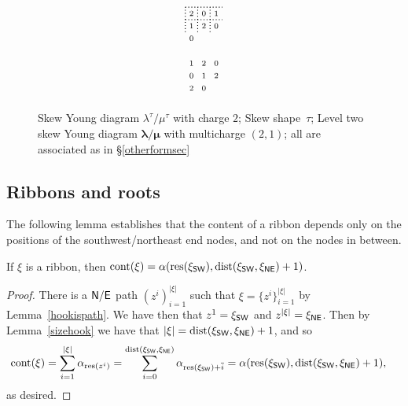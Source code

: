 \documentclass[Unicode,ALCO]{cedram}
\newcommand{\res}{\operatorname{res}}
\newcommand{\0}{{\bar 0}}
\newcommand{\dist}{{\mathrm {dist}}}
\newcommand{\no}{{\sf N}}
\newcommand{\ea}{{\sf E}}
\newcommand{\nnee}{{\sf NE}}
\newcommand{\ssww}{{\sf SW}}
\newcommand{\blam}{\boldsymbol{\lambda}}
\newcommand{\bmu}{\boldsymbol{\mu}}
\def\cont{{\operatorname{cont}}}
\begin{document}
\begin{figure}
\begin{align*}
{\begin{tikzpicture}[scale=0.4]
\draw[thick, dotted] (0,6)--(3,6);
\draw[thick, dotted] (0,7)--(3,7);
\draw[thick, dotted] (0,5)--(0,7);
\draw[thick, dotted] (1,5)--(1,7);
\draw[thick, dotted] (2,5)--(2,7);
\node at (0.5,0.5){$\scriptstyle2 $};
\node at (0.5,1.5){$\scriptstyle0 $};
\node at (0.5,2.5){$\scriptstyle1 $};
\node at (1.5,0.5){$\scriptstyle0 $};
\node at (1.5,1.5){$\scriptstyle1 $};
\node at (1.5,2.5){$\scriptstyle2 $};
\node at (2.5,1.5){$\scriptstyle2 $};
\node at (2.5,2.5){$\scriptstyle0 $};
\node at (0.5,4.5){$\scriptstyle0 $};
\node at (0.5,5.5){$\scriptstyle1 $};
\node at (0.5,6.5){$\scriptstyle2 $};
\node at (1.5,5.5){$\scriptstyle2 $};
\node at (1.5,6.5){$\scriptstyle0 $};
\node at (2.5,5.5){$\scriptstyle0 $};
\node at (2.5,6.5){$\scriptstyle1 $};
\end{tikzpicture}
}
\end{align*}
\caption{Skew Young diagram \(\lambda^\tau/\mu^\tau\) with charge \(2\); Skew shape~\(\tau\); Level two skew Young diagram \(\blam/\bmu\) with multicharge \((2,1)\); all are associated as in \S\ref{otherformsec}}
\label{fig:Muth1}       
\end{figure}


\subsection{Ribbons and roots}
The following lemma establishes that the content of a ribbon depends only on the positions of the southwest/northeast end nodes, and not on the nodes in between.
\begin{lemma}\label{hookcont}
If \(\xi\) is a ribbon, then \(\cont(\xi) = \alpha(\res(\xi_{\ssww}), \dist(\xi_{\ssww},\xi_{\nnee})+1)\).
\end{lemma}
\begin{proof}
There is a \(\no/\ea\) path \((z^i)_{i=1}^{|\xi|}\) such that \(\xi = \{z^i\}_{i=1}^{|\xi|}\) by Lemma~\ref{hookispath}. We have then that \(z^1 = \xi_{\ssww}\) and \(z^{|\xi|} = \xi_{\nnee}\). Then by Lemma~\ref{sizehook} we have that \(|\xi| = \dist(\xi_{\ssww}, \xi_{\nnee})+1\), and so
\begin{align*}
\cont(\xi) &= \sum_{i=1}^{|\xi|} \alpha_{\res(z^i)} =
\sum_{i=0}^{\dist(\xi_{\ssww}, \xi_{\nnee})} \alpha_{ \res(\xi_{\ssww}) + \overline{i}}
=
 \alpha(\res(\xi_{\ssww}), \dist(\xi_{\ssww},\xi_{\nnee})+1),
\end{align*}
as desired.
\end{proof}
\end{document}

